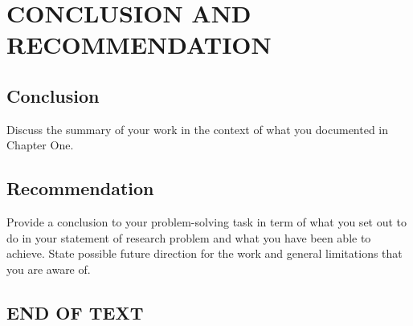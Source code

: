 \chapter{\large CONCLUSION AND RECOMMENDATION}
\thispagestyle{empty}

\section{Conclusion}

Discuss the summary of your work in the context of what you documented in Chapter One.

\section{Recommendation}

Provide a conclusion to your problem-solving task in term of what you set out to do in your statement of research problem and what you have been able to achieve. State possible future direction for the work and general limitations that you are aware of. 

\section*{END OF TEXT}